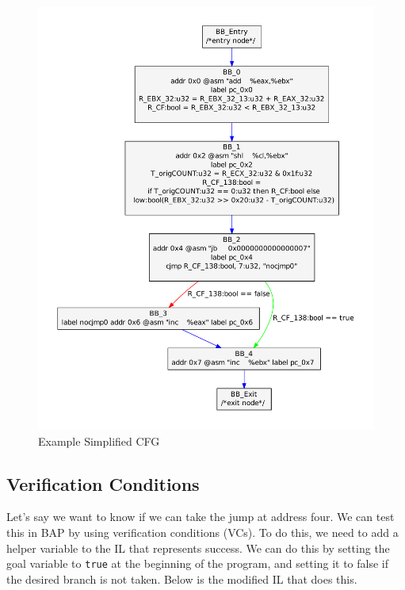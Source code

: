 \begin{figure}[p]
  \begin{center}
    \includegraphics[height=.9\textheight]{chap-examples/ssasimpcfg.pdf}
  \end{center}
  \caption{Example Simplified CFG}
  \label{fig:cfgsimp}
\end{figure}
\FloatBarrier

\subsection{Verification Conditions}

Let's say we want to know if we can take the jump at address four.  We
can test this in BAP by using verification conditions (VCs).  To do
this, we need to add a helper variable to the IL that represents
success.  We can do this by setting the goal variable to \texttt{true}
at the beginning of the program, and setting it to false if the
desired branch is not taken.  Below is the modified IL that does this.

